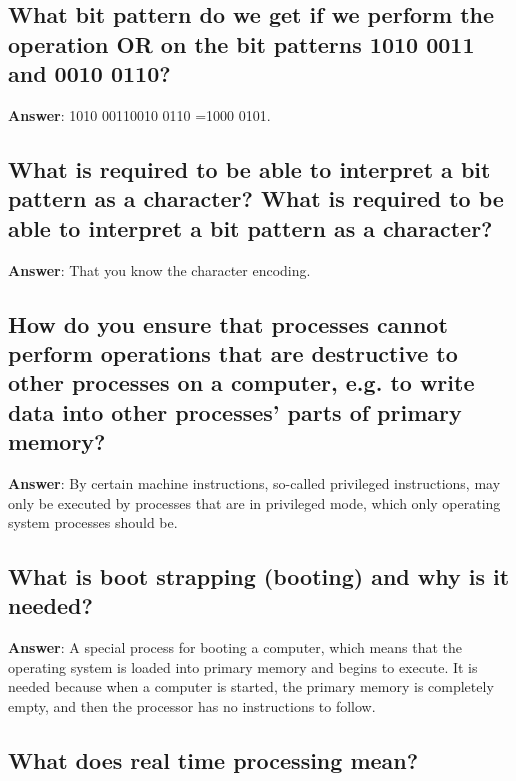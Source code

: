 \documentclass[a4paper,11pt,oneside]{article}
\begin{document}
\begin{sloppypar}
\subsection{What bit pattern do we get if we perform the operation OR on the bit patterns 1010 0011 and 0010 0110?}

\label{q:101:sa:en:True}

\textbf{Answer}: 1010 00110010 0110 =1000 0101.



\subsection{What is required to be able to interpret a bit pattern as a character? What is required to be able to interpret a bit pattern as a character?}

\label{q:102:sa:en:True}

\textbf{Answer}: That you know the character encoding.



\subsection{How do you ensure that processes cannot perform operations that are destructive to other processes on a computer, e.g. to write data into other processes' parts of primary memory?}

\label{q:104:sa:en:True}

\textbf{Answer}: By certain machine instructions, so-called privileged instructions, may only be executed by processes that are in privileged mode, which only operating system processes should be.



\subsection{What is boot strapping (booting) and why is it needed?}

\label{q:105:sa:en:True}

\textbf{Answer}: A special process for booting a computer, which means that the operating system is loaded into primary memory and begins to execute. It is needed because when a computer is started, the primary memory is completely empty, and then the processor has no instructions to follow.



\subsection{What does real time processing mean?}


\end{sloppypar}
\end{document}
